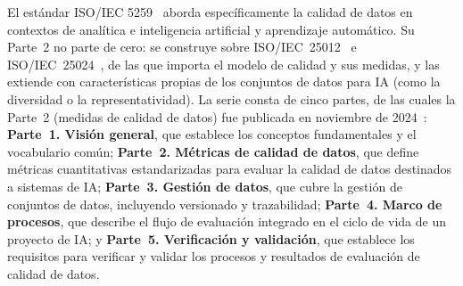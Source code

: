 El estándar \ac{ISO}/\ac{IEC} 5259~\citep{iso5259} aborda específicamente la
calidad de datos en contextos de analítica e inteligencia artificial y
aprendizaje automático. Su Parte~2 no parte de cero: se construye sobre
\ac{ISO}/\ac{IEC}~25012~\citep{iso25012} e \ac{ISO}/\ac{IEC}~25024~\citep{iso25024},
de las que importa el modelo de calidad y sus medidas, y las extiende con
características propias de los conjuntos de datos para \ac{IA} (como la
diversidad o la representatividad). La serie consta de cinco partes, de las
cuales la Parte~2 (medidas de calidad de datos) fue publicada en noviembre de
2024~\citep{iso5259}: \textbf{Parte~1. Visión general}, que establece los
conceptos fundamentales y el vocabulario común; \textbf{Parte~2. Métricas de
calidad de datos}, que define métricas cuantitativas estandarizadas para
evaluar la calidad de datos destinados a sistemas de \ac{IA}; \textbf{Parte~3.
Gestión de datos}, que cubre la gestión de conjuntos de datos, incluyendo
versionado y trazabilidad; \textbf{Parte~4. Marco de procesos}, que describe el
flujo de evaluación integrado en el ciclo de vida de un proyecto de \ac{IA}; y
\textbf{Parte~5. Verificación y validación}, que establece los requisitos para
verificar y validar los procesos y resultados de evaluación de calidad de datos.

